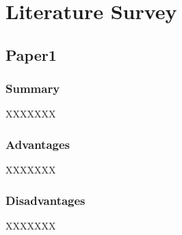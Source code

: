 \chapter{Literature Survey}

\section{Paper1}

\subsection{Summary}

XXXXXXX

\subsection{Advantages}

XXXXXXX
\subsection{Disadvantages}

XXXXXXX